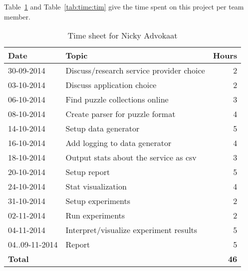Table~\ref{tab:time:nicky} and Table~\ref{tab:time:tim} give the time spent on this project per team member.

\begin{table}[H]
	\begin{tabular}{l p{2.7cm} r}
		\textbf{Date}&	\textbf{Topic}&	\textbf{Hours}\\\hline
		30-09-2014 & Discuss/research service provider choice & 2 \\
		03-10-2014 & Discuss application choice & 2 \\
		06-10-2014 & Find puzzle collections online & 3 \\
		08-10-2014 & Create parser for puzzle format & 4 \\
		14-10-2014 & Setup data generator & 5 \\
		16-10-2014 & Add logging to data generator & 4 \\
		18-10-2014 & Output stats about the service as csv & 3 \\
		20-10-2014 & Setup report & 5 \\
		24-10-2014 & Stat visualization & 4 \\
		31-10-2014 & Setup experiments & 2 \\
		02-11-2014 & Run experiments & 2 \\
		04-11-2014 & Interpret/visualize experiment results & 5 \\
		04..09-11-2014 & Report & 5 \\
		\hline
		\textbf{Total}&	&	\textbf{46}
	\end{tabular}
	\caption{Time sheet for Nicky Advokaat}
	\label{tab:time:nicky}
\end{table}

